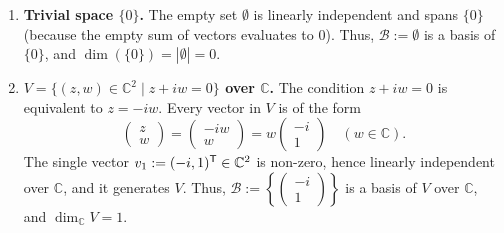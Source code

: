 \begin{exercisesolution*}
\begin{enumerate}[label=\textbf{(\alph*)}]
    \item \textbf{Trivial space $\{0\}$.} The empty set $\emptyset$ is linearly independent and spans $\{0\}$ (because the empty sum of vectors evaluates to $0$). Thus, $\mathcal{B} := \emptyset$ is a basis of $\{0\}$, and $\dim(\{0\}) = |\emptyset| = 0$.

    \item \textbf{$V = \{(z, w) \in \mathbb{C}^2 \mid z + iw = 0\}$ over $\mathbb{C}$.} The condition $z + iw = 0$ is equivalent to $z = -iw$. Every vector in $V$ is of the form
    \[
        \begin{pmatrix} z \\ w \end{pmatrix} = \begin{pmatrix} -iw \\ w \end{pmatrix} = w \begin{pmatrix} -i \\ 1 \end{pmatrix} \quad (w \in \mathbb{C}).
    \]
    The single vector $v_1 := (-i, 1)^{\mathsf{T}} \in \mathbb{C}^2$ is non-zero, hence linearly independent over $\mathbb{C}$, and it generates $V$. Thus, $\mathcal{B} := \left\{ \left(\begin{smallmatrix} -i \\ 1 \end{smallmatrix}\right) \right\}$ is a basis of $V$ over $\mathbb{C}$, and $\dim_{\mathbb{C}} V = 1$.


\end{enumerate}
\end{exercisesolution*}
